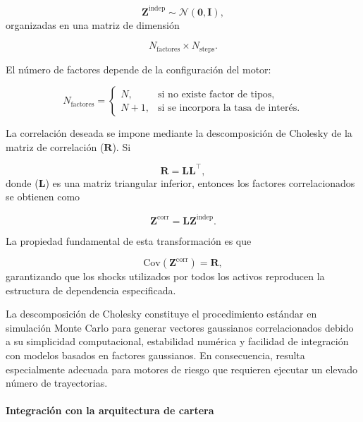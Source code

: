 \documentclass[11pt]{article}
\begin{document}
\begin{equation}
\mathbf{Z}^{\text{indep}}
\sim
\mathcal{N}(\mathbf{0},\mathbf{I}),
\end{equation}
organizadas en una matriz de dimensión

$$
N_{\text{factores}} \times N_{\text{steps}}.
$$

El número de factores depende de la configuración del motor:

\begin{equation}
N_{\text{factores}}=
\begin{cases}
N, & \text{si no existe factor de tipos},\\
N+1, & \text{si se incorpora la tasa de interés}.
\end{cases}
\end{equation}

La correlación deseada se impone mediante la descomposición de Cholesky \cite{higham2009cholesky} de la matriz de correlación ($\mathbf{R}$). Si

\begin{equation}
\mathbf{R} = \mathbf{L}\mathbf{L}^{\top},
\label{eq:cholesky}
\end{equation}
donde ($\mathbf{L}$) es una matriz triangular inferior, entonces los factores correlacionados se obtienen como

\begin{equation}
\mathbf{Z}^{\text{corr}} =
\mathbf{L}
\mathbf{Z}^{\text{indep}}.
\label{eq:correlated_shocks}
\end{equation}

La propiedad fundamental de esta transformación es que

\begin{equation}
\mathrm{Cov}
\left(
\mathbf{Z}^{\text{corr}}
\right) =
\mathbf{R},
\end{equation}
garantizando que los shocks utilizados por todos los activos reproducen la estructura de dependencia especificada.

La descomposición de Cholesky constituye el procedimiento estándar en simulación Monte Carlo para generar vectores gaussianos correlacionados debido a su simplicidad computacional, estabilidad numérica y facilidad de integración con modelos basados en factores gaussianos. En consecuencia, resulta especialmente adecuada para motores de riesgo que requieren ejecutar un elevado número de trayectorias.

\paragraph{Integración con la arquitectura de cartera}
\end{document}
